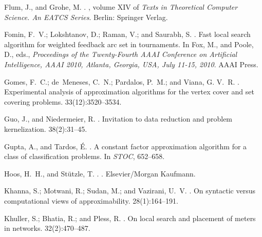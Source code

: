 \documentclass[10pt,usletter]{article}
\begin{document}
{\begin{thebibliography}{}
Flum, J., and Grohe, M.
.
, volume XIV of {\em Texts in
  Theoretical Computer Science. An EATCS Series}.
\newblock Berlin: Springer Verlag.

Fomin, F.~V.; Lokshtanov, D.; Raman, V.; and Saurabh, S.
.
\newblock Fast local search algorithm for weighted feedback arc set in
  tournaments.
\newblock In Fox, M., and Poole, D., eds., {\em Proceedings of the
  Twenty-Fourth AAAI Conference on Artificial Intelligence, AAAI 2010, Atlanta,
  Georgia, USA, July 11-15, 2010}.
\newblock AAAI Press.
 
Gomes, F.~C.; de~Meneses, C.~N.; Pardalos, P.~M.; and Viana, G. V.~R.
.
\newblock Experimental analysis of approximation algorithms for the vertex
  cover and set covering problems.
 33(12):3520--3534.

Guo, J., and Niedermeier, R.
.
\newblock Invitation to data reduction and problem kernelization.
 38(2):31--45.

Gupta, A., and Tardos, {\'E}.
.
\newblock A constant factor approximation algorithm for a class of
  classification problems.
\newblock In {\em STOC},  652--658.

Hoos, H.~H., and St{\"u}tzle, T.
.
.
\newblock Elsevier/Morgan Kaufmann.

Khanna, S.; Motwani, R.; Sudan, M.; and Vazirani, U.~V.
.
\newblock On syntactic versus computational views of approximability.
 28(1):164--191.

Khuller, S.; Bhatia, R.; and Pless, R.
.
\newblock On local search and placement of meters in networks.
 32(2):470--487.


\end{thebibliography}}
\end{document}
